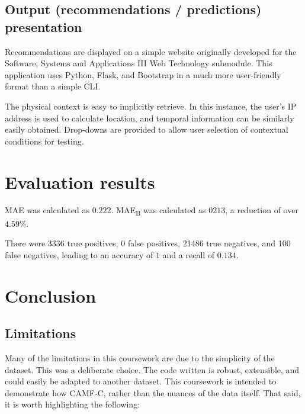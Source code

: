 \documentclass[conference]{IEEEtran}
\begin{document}
\subsection{Output (recommendations / predictions) presentation}

Recommendations are displayed on a simple website originally developed for the Software, Systems and Applications III Web Technology submodule. This application uses Python, Flask, and Bootstrap in a much more user-friendly format than a simple CLI.

The physical context is easy to implicitly retrieve. In this instance, the user's IP address is used to calculate location, and temporal information can be similarly easily obtained. Drop-downs are provided to allow user selection of contextual conditions for testing. 

\section{Evaluation results}

MAE was calculated as $0.222$. MAE\textsubscript{B} was calculated as $0213$, a reduction of over $4.59\%$. 

There were 3336 true positives, 0 false positives, 21486 true negatives, and 100 false negatives, leading to an accuracy of $1$ and a recall of $0.134$.

\section{Conclusion}

\subsection{Limitations}

Many of the limitations in this coursework are due to the simplicity of the dataset. This was a deliberate choice. The code written is robust, extensible, and could easily be adapted to another dataset. This coursework is intended to demonstrate how CAMF-C, rather than the nuances of the data itself. That said, it is worth highlighting the following:
\end{document}
